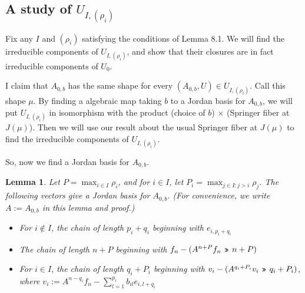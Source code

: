 \documentclass[12pt,psamsfonts]{article}
\newcommand{\leftshift}{\,\texttt{<<}\,}
\newcommand{\rightshift}{\mathbin{\rotatebox[origin=c]{180}{\leftshift}}}
\newtheorem{lemma}[theorem]{Lemma}
\begin{document}
\subsection{A study of \(U_{I, (\rho_i)}\)}
Fix any \(I\) and \((\rho_i)\) satisfying the conditions of Lemma 8.1.
We will find the irreducible components of \(U_{I, (\rho_i)}\), and show that their closures are in fact irreducible components of \(U_0\).
\par I claim that \(A_{0,b}\) has the same shape for every \((A_{0, b}, U) \in U_{I, (\rho_i)}\).
Call this shape \(\mu\).
By finding a algebraic map taking \(b\) to a Jordan basis for \(A_{0,b}\), we will put \(U_{I, (\rho_i)}\) in isomorphism with the product (choice of \(b\)) \(\times\) (Springer fiber at \(J(\mu)\)).
Then we will use our result about the usual Springer fiber at \(J(\mu)\) to find the irreducible components of \(U_{I, (\rho_i)}\).
\par So, now we find a Jordan basis for \(A_{0, b}\).
\begin{lemma}
    Let \(P = \max_{i \in I} \rho_i\), and for \(i \in I\), let \(P_i = \max_{j \in I : j > i} \rho_j\).
    The following vectors give a Jordan basis for \(A_{0,b}\).
    (For convenience, we write \(A := A_{0,b}\) in this lemma and proof.)
    \begin{itemize}
        \item For \(i \notin I\), the chain of length \(p_i + q_i\) beginning with \(e_{i, p_i + q_i}\)
        \item The chain of length \(n + P\) beginning with \(f_n - (A^{n + P}f_n \rightshift n + P)\)
        \item For \(i \in I\), the chain of length \(q_i + P_i\) beginning with \(v_i - (A^{q_i + P_i} v_i \rightshift q_i + P_i)\), where \(v_i := A^{n - q_i} f_n - \sum_{l = 1}^{p_i} b_{il} e_{i,l + q_i}\)
    \end{itemize}
\end{lemma}
\end{document}
